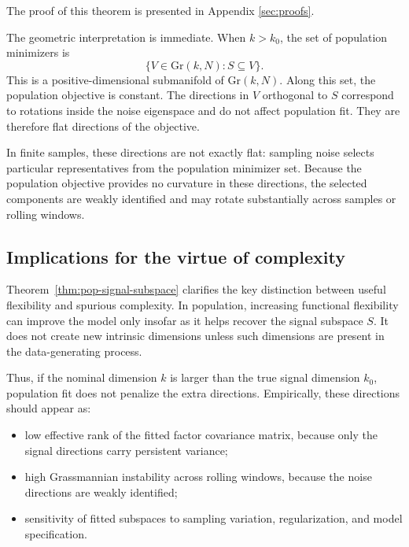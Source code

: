 \documentclass[11pt,letterpaper]{article}
\newcommand{\gr}{\mathrm{Gr}}
\begin{document}
\smallskip\noindent
The proof of this theorem is presented in Appendix \ref{sec:proofs}.

The geometric interpretation is immediate. When $k>k_0$, the set of population minimizers is
\begin{equation}
\label{eq:minimizer-flat-manifold}
\{V\in\gr(k,N): S\subseteq V\}.
\end{equation}
This is a positive-dimensional submanifold of $\gr(k,N)$. Along this set, the population objective is constant. The directions in $V$ orthogonal to $S$ correspond to rotations inside the noise eigenspace and do not affect population fit. They are therefore flat directions of the objective.

In finite samples, these directions are not exactly flat: sampling noise selects particular representatives from the population minimizer set. Because the population objective provides no curvature in these directions, the selected components are weakly identified and may rotate substantially across samples or rolling windows.

\subsection{Implications for the virtue of complexity}
\label{subsec:population-complexity-implications}

Theorem~\ref{thm:pop-signal-subspace} clarifies the key distinction between useful flexibility and spurious complexity. In population, increasing functional flexibility can improve the model only insofar as it helps recover the signal subspace $S$. It does not create new intrinsic dimensions unless such dimensions are present in the data-generating process.

Thus, if the nominal dimension $k$ is larger than the true signal dimension $k_0$, population fit does not penalize the extra directions. Empirically, these directions should appear as:
\begin{itemize}
\item[(i)] low effective rank of the fitted factor covariance matrix, because only the signal directions carry persistent variance;
\item[(ii)] high Grassmannian instability across rolling windows, because the noise directions are weakly identified;
\item[(iii)] sensitivity of fitted subspaces to sampling variation, regularization, and model specification.
\end{itemize}
\end{document}
